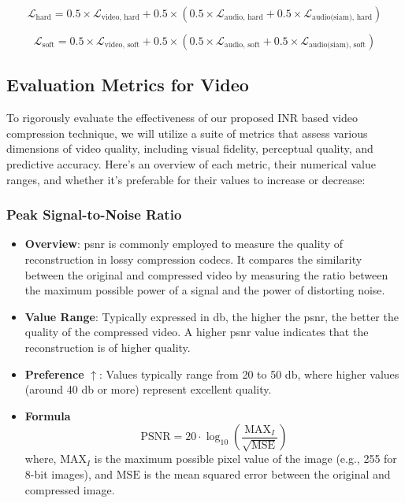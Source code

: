 \documentclass{ioereport}
\begin{document}
    \begin{equation}
        \mathcal{L}_{\text{hard}} = 0.5 \times \mathcal{L}_{\text{video, hard}} + 0.5 \times \left( 0.5 \times \mathcal{L}_{\text{audio, hard}} + 0.5 \times \mathcal{L}_{\text{audio(siam), hard}} \right)
    \end{equation}

    \begin{equation}
        \mathcal{L}_{\text{soft}} = 0.5 \times \mathcal{L}_{\text{video, soft}} + 0.5 \times \left( 0.5 \times \mathcal{L}_{\text{audio, soft}} + 0.5 \times \mathcal{L}_{\text{audio(siam), soft}} \right)
    \end{equation}

    
    \subsection{Evaluation Metrics for Video}
        To rigorously evaluate the effectiveness of our proposed INR based video compression technique, we will utilize a suite of metrics that assess various dimensions of video quality, including visual fidelity, perceptual quality, and predictive accuracy. Here's an overview of each metric, their numerical value ranges, and whether it's preferable for their values to increase or decrease:
        \subsubsection{Peak Signal-to-Noise Ratio}
            \begin{itemize}
                \item \textbf{Overview}: \gls{psnr} is commonly employed to measure the quality of reconstruction in lossy compression \gls{codec}s. It compares the similarity between the original and compressed video by measuring the ratio between the maximum possible power of a signal and the power of distorting noise.
                \item \textbf{Value Range}: Typically expressed in \gls{db}, the higher the \gls{psnr}, the better the quality of the compressed video. A higher \gls{psnr} value indicates that the reconstruction is of higher quality.
                \item \textbf{Preference} $\uparrow$: Values typically range from 20 to 50 \gls{db}, where higher values (around 40 \gls{db} or more) represent excellent quality.
                \item \textbf{Formula}
                \begin{equation}\label{eqn:PSNR}
                    \text{PSNR} = 20 \cdot \log_{10}\left(\frac{{\text{MAX}_I}}{\sqrt{\text{MSE}}}\right)
                \end{equation}
                where, $\text{MAX}_I$ is the maximum possible pixel value of the image (e.g., 255 for 8-bit images), and $\text{MSE}$ is the mean squared error between the original and compressed image.
               \end{itemize} 
\end{document}
